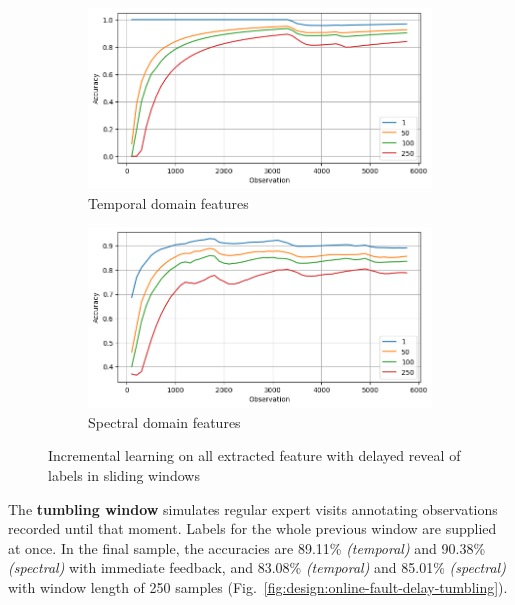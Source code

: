 \begin{figure}[ht]
    \centering
    \begin{subfigure}[b]{0.49\textwidth}
        \includegraphics[width=\textwidth]{assets/design/gradual-learning-accuracy-delay-temporal-domain-fault.png}
        \caption{Temporal domain features}
    \end{subfigure}
    \hfill
    \begin{subfigure}[b]{0.49\textwidth}
        \includegraphics[width=\textwidth]{assets/design/gradual-learning-accuracy-delay-spectral-domain-fault.png}
        \caption{Spectral domain features}
    \end{subfigure}
    \caption{Incremental learning on all extracted feature with delayed reveal of labels in sliding windows}
    \label{fig:design:online-fault-delay-sliding}
\end{figure}
	
	
The \textbf{tumbling window} simulates regular expert visits annotating observations recorded until that moment. Labels for the whole previous window are supplied at once. In the final sample, the accuracies are 89.11\% \emph{(temporal)} and 90.38\% \emph{(spectral)} with immediate feedback, and 83.08\% \emph{(temporal)} and 85.01\% \emph{(spectral)} with window length of 250 samples (Fig.~\ref{fig:design:online-fault-delay-tumbling}). 

